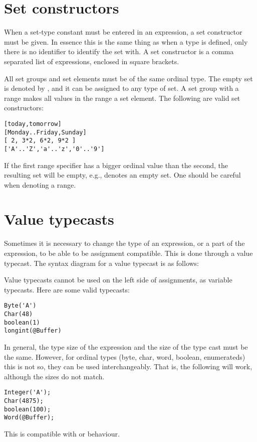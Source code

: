 \section{Set constructors}
When a set-type constant must be entered in an expression, a
set constructor must be given. In essence this is the same thing as when a
type is defined, only there is no identifier to identify the set with.
A set constructor is a comma separated list of expressions, enclosed in
square brackets.

All set groups and set elements must be of the same ordinal type.
The empty set is denoted by \var{[]}, and it can be assigned to any type of
set. A set group with a range  \var{[A..Z]} makes all values in the range a
set element. 
The following are valid set constructors:
\begin{verbatim}
[today,tomorrow]
[Monday..Friday,Sunday]
[ 2, 3*2, 6*2, 9*2 ]
['A'..'Z','a'..'z','0'..'9']
\end{verbatim}
\begin{remark}
If the first range specifier has a bigger ordinal value than
the second, the resulting set will be empty, e.g., \var{['Z'..'A']} 
denotes an empty set. One should be careful when denoting a range.
\end{remark}

\section{Value typecasts}
Sometimes it is necessary to change the type of an expression, or a part of
the expression, to be able to be assignment compatible. This is done through
a value typecast. The syntax diagram for a value typecast is as follows:

Value typecasts cannot be used on the left side of assignments, as variable
typecasts.
Here are some valid typecasts:
\begin{verbatim}
Byte('A')
Char(48)
boolean(1)
longint(@Buffer)
\end{verbatim}
In general, the type size of the expression and the size of the type cast 
must be the same. However, for ordinal types (byte, char, word, boolean,
enumerateds) this is not so, they can be used interchangeably. 
That is, the following will work, although the sizes do not match.
\begin{verbatim}
Integer('A');
Char(4875);
boolean(100);
Word(@Buffer);
\end{verbatim}
This is compatible with \delphi or \tp behaviour.

